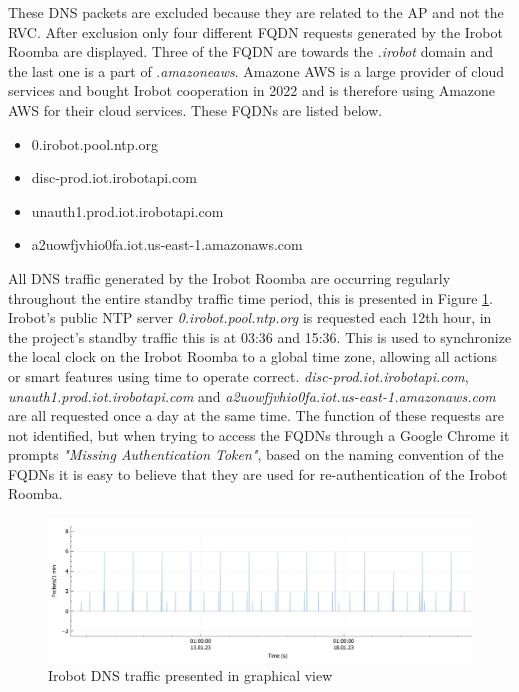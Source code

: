 These DNS packets are excluded because they are related to the AP and not the RVC. After exclusion only four different FQDN requests generated by the Irobot Roomba are displayed. Three of the FQDN are towards the \textit{.irobot} domain and the last one is a part of .\textit{amazoneaws}. Amazone AWS is a large provider of cloud services and bought Irobot cooperation in 2022 \cite{irobot2023_amazone} and is therefore using Amazone AWS for their cloud services. These FQDNs are listed below. 

\begin{itemize}
    \item 0.irobot.pool.ntp.org
    \item disc-prod.iot.irobotapi.com
    \item unauth1.prod.iot.irobotapi.com
    \item a2uowfjvhio0fa.iot.us-east-1.amazonaws.com
\end{itemize}

All DNS traffic generated by the Irobot Roomba are occurring regularly throughout the entire standby traffic time period, this is presented in Figure \ref{fig:dns_irobot_graph}. Irobot's public NTP server \textit{0.irobot.pool.ntp.org} is requested each 12th hour,  in the project's standby traffic this is at 03:36 and 15:36. This is used to synchronize the local clock on the Irobot Roomba to a global time zone, allowing all actions or smart features using time to operate correct. \textit{disc-prod.iot.irobotapi.com}, \textit{unauth1.prod.iot.irobotapi.com} and \textit{a2uowfjvhio0fa.iot.us-east-1.amazonaws.com} are all requested once a day at the same time. The function of these requests are not identified, but when trying to access the FQDNs through a Google Chrome it prompts \textit{"Missing Authentication Token"}, based on the naming convention of the FQDNs it is easy to believe that they are used for re-authentication of the Irobot Roomba. 

\begin{figure}[H]
    \centering
    \includegraphics[width=\textwidth]{figures/DNS_irobot_graph.png}
    \caption{Irobot DNS traffic presented in graphical view}
    \label{fig:dns_irobot_graph}
\end{figure}

